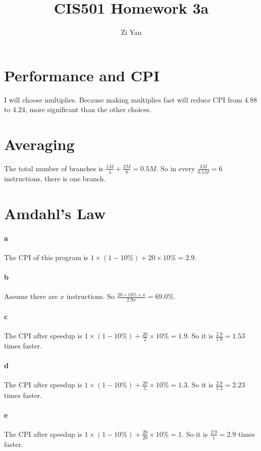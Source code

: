 \documentclass[12pt,letterpaper]{article}
\author{Zi Yan}
\title{CIS501 Homework 3a}
\date{}
\begin{document}
\maketitle

\section{Performance and CPI}
I will choose multiplies. Because making multiplies fast will reduce CPI
from 4.88 to 4.24, more significant than the other choices.

\section{Averaging}
The total number of branches is $\frac{1M}{4}+\frac{2M}{8} = 0.5M$.
So in every $\frac{3M}{0.5M} = 6$ instructions, there is one branch.

\section{Amdahl's Law}
\paragraph*{a}
The CPI of this program is $1 \times (1-10\%) + 20 \times 10\% = 2.9$.

\paragraph*{b}
Assume there are $x$ instructions. So $\frac{20\times10\%\times x}{2.9x}
=69.0\%$.

\paragraph*{c}
The CPI after speedup is $1\times (1-10\%) + \frac{20}{2}\times 10\% = 1.9$.
So it is $\frac{2.9}{1.9}=1.53$ times faster.

\paragraph*{d}
The CPI after speedup is $1\times (1-10\%) + \frac{20}{5}\times 10\% = 1.3$.
So it is $\frac{2.9}{1.3}=2.23$ times faster.

\paragraph*{e}
The CPI after speedup is $1\times (1-10\%) + \frac{20}{20}\times 10\% = 1$.
So it is $\frac{2.9}{1}=2.9$ times faster.
\end{document}
